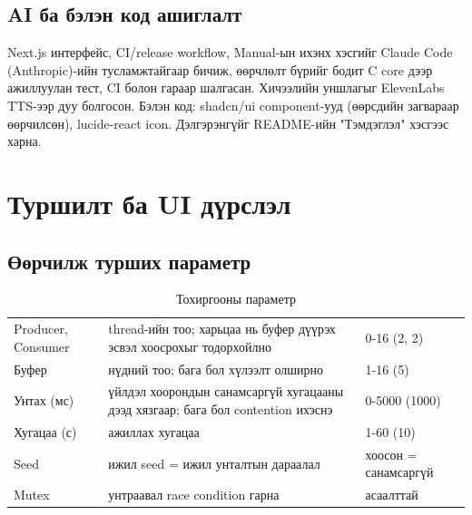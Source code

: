 \documentclass[12pt,a4paper]{article}
\begin{document}
\subsection{AI ба бэлэн код ашиглалт}
Next.js интерфейс, CI/release workflow, Manual-ын ихэнх хэсгийг Claude Code (Anthropic)-ийн тусламжтайгаар бичиж, өөрчлөлт бүрийг бодит C core дээр ажиллуулан тест, CI болон гараар шалгасан. Хичээлийн уншлагыг ElevenLabs TTS-ээр дуу болгосон. Бэлэн код: shadcn/ui component-ууд (өөрсдийн загвараар өөрчилсөн), lucide-react icon. Дэлгэрэнгүйг README-ийн "Тэмдэглэл" хэсгээс харна.

\section{Туршилт ба UI дүрслэл}

\subsection{Өөрчилж турших параметр}
\begin{table}[H]\centering\small
\caption{Тохиргооны параметр}\label{tab:params}
\begin{tabular}{|L{0.22\textwidth}|L{0.48\textwidth}|L{0.3\textwidth}|}\hline
{} &  &  \\\hline
Producer, Consumer & thread-ийн тоо; харьцаа нь буфер дүүрэх эсвэл хоосрохыг тодорхойлно & 0-16 (2, 2) \\\hline
Буфер & нүдний тоо; бага бол хүлээлт олширно & 1-16 (5) \\\hline
Унтах (мс) & үйлдэл хоорондын санамсаргүй хугацааны дээд хязгаар; бага бол contention ихэснэ & 0-5000 (1000) \\\hline
Хугацаа (с) & ажиллах хугацаа & 1-60 (10) \\\hline
Seed & ижил seed = ижил унталтын дараалал & хоосон = санамсаргүй \\\hline
Mutex & унтраавал race condition гарна & асаалттай \\\hline
\end{tabular}
\end{table}

\end{document}
